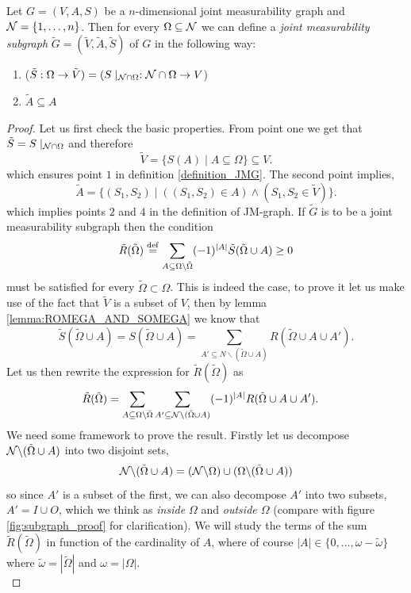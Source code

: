 \documentclass[10pt, a4paper]{amsart}
\begin{document}
\begin{proposition}\label{Propositions:THERE_ARE_SUBGRAPHS}
Let $G = (V,A,S)$ be a $n$-dimensional joint measurability graph and $\mathcal{N} = \{1, \ldots ,n\}$. Then for every $\Omega \subseteq \mathcal{N} $  we can define a \emph{joint measurability subgraph} $\tilde{G} = (\tilde{V}, \tilde{A}, \tilde{S})$ of $G$ in the following way:
\begin{enumerate}
\item ($\tilde{S}: \Omega \to \tilde{V}) = (S\mid_{\mathcal{N}\cap \Omega}: \mathcal{N}\cap \Omega \to V$)
\item $\tilde{A}\subseteq A$
\end{enumerate}

\end{proposition}

\begin{proof}
Let us first check the basic properties. From point one we get that $\tilde{S} = S\mid_{\mathcal{N} \cap \Omega}$ and therefore
$$
\tilde{V} = \{S(A)\mid A \subseteq \Omega\}\subseteq {V}.
$$
which ensures point $1$ in definition \ref{definition_JMG}. 
The second point implies, 
$$
\tilde{A} = \{(S_{1},S_{2}) \mid  ( (S_{1},S_{2})\in A) \wedge ( S_{1},S_{2}\in \tilde{V}) \}.
$$
which implies points $2$ and $4$ in the definition of JM-graph.
If $\tilde{G}$ is to be a joint measurability subgraph then the condition 
$$
\tilde{R}(\tilde{\Omega} ) \overset{\mathrm{def}}{=}
 \sum_{A\subseteq \Omega \backslash \tilde{\Omega}} (-1)^{|A|}\tilde{S}(\tilde{\Omega}\cup A )\geq 0
$$
must be satisfied for every $\tilde{\Omega}\subset \Omega$. This is indeed the case, to prove it let us make use of the fact that $\tilde{V}$ is a subset of ${V}$, then by lemma 
\ref{lemma:ROMEGA_AND_SOMEGA} we know that 
$$
\tilde{S}(\tilde{\Omega}\cup A ) = S(\tilde{\Omega}\cup A ) = \sum_{A'\subseteq N\backslash ( \tilde{\Omega}\cup A ) } R(\tilde{\Omega}\cup A \cup A' ) .
$$
Let us then rewrite the expression for $\tilde{R}(\tilde{\Omega})$ as 
\begin{align*}
\tilde{R}(\tilde{\Omega}) &= 
 \sum_{A\subseteq \Omega \backslash \tilde{\Omega}}
 \sum_{A'\subseteq \mathcal{N}\backslash ( \tilde{\Omega}\cup A ) } 
  (-1)^{|A|}
 R(\tilde{\Omega}\cup A \cup A' )  .
\end{align*}
We need some framework to prove the result. Firstly let us decompose $\mathcal{N} \backslash (\tilde{\Omega}\cup A ) $ into two disjoint sets, 
$$
\mathcal{N} \backslash (\tilde{\Omega}\cup A ) = (\mathcal{N} \backslash \Omega) \cup (\Omega \backslash (\tilde{\Omega }\cup A )  )
$$
so since $A'$ is a subset of the first, we can also decompose $A'$ into two subsets, $A' = I \cup O$, which we think as \emph{inside $\Omega$} and \emph{outside $\Omega$} (compare with figure \ref{fig:subgraph_proof} for clarification). We will study the terms of the sum $\tilde{R}(\tilde{\Omega})$ in function of the cardinality of $A$, where of course $|A|\in \{0 , \ldots , \omega - \tilde{\omega}\}$ where $\tilde{\omega} = |\tilde{\Omega}|$ and $\omega = |\Omega|$. \\

\end{proof}
\end{document}
